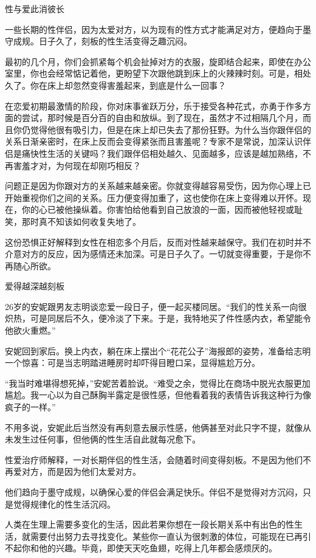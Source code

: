 \documentclass[12pt,UTF8]{ctexbook}
\begin{document}
性与爱此消彼长


一些长期的性伴侣，因为太爱对方，以为现有的性方式才能满足对方，便趋向于墨守成规。日子久了，刻板的性生活变得乏趣沉闷。

最初的几个月，你们会抓紧每个机会扯掉对方的衣服，旋即结合起来，即使在办公室里，你也会经常惦记着他，更盼望下次跟他跳到床上的火辣辣时刻。可是，相处久了。你在床上却忽然变得害羞起来，到底是什么一回事？

在恋爱初期最激情的阶段，你对床事雀跃万分，乐于接受各种花式，亦勇于作多方面的尝试，那时候是百分百的自由和放纵。到了现在，虽然才不过相隔几个月，而且你仍觉得他很有吸引力，但是在床上却已失去了那份狂野。为什么当你跟伴侣的关系日渐亲密时，在床上反而会变得紧张而且害羞呢？专家不是常说，加深认识伴侣是痛快性生活的关键吗？我们跟伴侣相处越久、见面越多，应该是越加熟络，不再害羞才对，为何现在却刚巧相反？

问题正是因为你跟对方的关系越来越亲密。你就变得越容易受伤，因为你心理上已开始重视你们之间的关系。压力便变得加重了，这也使你在床上变得难以开怀。现在，你的心已被他操纵着。你害怕给他看到自己放浪的一面，因而被他轻视或耻笑，那时真不知该如何收复失地了。

这份恐惧正好解释到女性在相恋多个月后，反而对性越来越保守。我们在初时并不介意对方的反应，因为感情还未加深。可是日子久了。一切就变得重要，于是你不再随心所欲。





爱得越深越刻板


26岁的安妮跟男友志明谈恋爱一段日子，便一起买楼同居。“我们的性关系一向很炽热，可是同居后不久，便冷淡了下来。于是，我特地买了件性感内衣，希望能令他欲火重燃。”

安妮回到家后。换上内衣，躺在床上摆出个“花花公子”海报郎的姿势，准备给志明一个惊喜：可是当志明踏进睡房时却吓得目瞪口呆，显得尴尬万分。

“我当时难堪得想死掉，”安妮苦着脸说。“难受之余，觉得比在商场中脱光衣服更加尴尬。我一心以为自己酥胸半露定是很性感，但他看着我的表情告诉我这种行为像疯子的一样。”

不用多说，安妮此后当然没有再刻意去展示性感，他俩甚至对此只字不提，就像从未发生过任何事，但他俩的性生活自此就每况愈下。

性爱治疗师解释，一对长期伴侣的性生活，会随着时间变得刻板。不是因为他们不再爱对方，而是因为他们太爱对方。

他们趋向于墨守成规，以确保心爱的伴侣会满足快乐。伴侣不是觉得对方沉闷，只是觉得规律化的性生活沉闷。

人类在生理上需要多变化的生活，因此若果你想在一段长期关系中有出色的性生活，就需要付出努力去寻找变化。某些你一直认为很刺激的体位，可能现在已再引不起你和他的兴趣。毕竟，即使天天吃鱼翅，吃得上几年都会感烦厌的。
\end{document}

